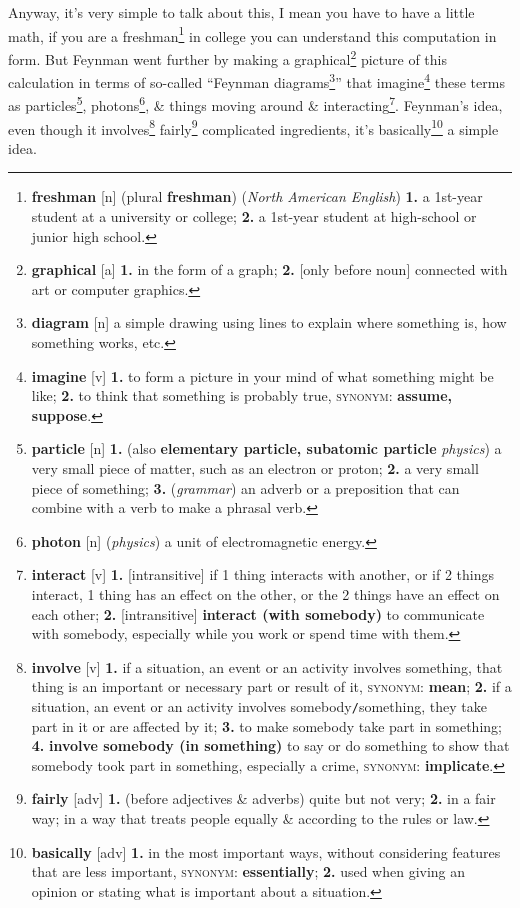 \documentclass[oneside]{book}
\numberwithin{equation}{section}
\begin{document}
Anyway, it's very simple to talk about this, I mean you have to have a little math, if you are a freshman\footnote{\textbf{freshman} [n] (plural \textbf{freshman}) (\textit{North American English}) \textbf{1.} a 1st-year student at a university or college; \textbf{2.} a 1st-year student at high-school or junior high school.} in college you can understand this computation in form. But Feynman went further by making a graphical\footnote{\textbf{graphical} [a] \textbf{1.} in the form of a graph; \textbf{2.} [only before noun] connected with art or computer graphics.} picture of this calculation in terms of so-called ``Feynman diagrams\footnote{\textbf{diagram} [n] a simple drawing using lines to explain where something is, how something works, etc.}'' that imagine\footnote{\textbf{imagine} [v] \textbf{1.} to form a picture in your mind of what something might be like; \textbf{2.} to think that something is probably true, \textsc{synonym}: \textbf{assume, suppose}.} these terms as particles\footnote{\textbf{particle} [n] \textbf{1.} (also \textbf{elementary particle, subatomic particle} \textit{physics}) a very small piece of matter, such as an electron or proton; \textbf{2.} a very small piece of something; \textbf{3.} (\textit{grammar}) an adverb or a preposition that can combine with a verb to make a phrasal verb.}, photons\footnote{\textbf{photon} [n] (\textit{physics}) a unit of electromagnetic energy.}, \& things moving around \& interacting\footnote{\textbf{interact} [v] \textbf{1.} [intransitive] if 1 thing interacts with another, or if 2 things interact, 1 thing has an effect on the other, or the 2 things have an effect on each other; \textbf{2.} [intransitive] \textbf{interact (with somebody)} to communicate with somebody, especially while you work or spend time with them.}. Feynman's idea, even though it involves\footnote{\textbf{involve} [v] \textbf{1.} if a situation, an event or an activity involves something, that thing is an important or necessary part or result of it, \textsc{synonym}: \textbf{mean}; \textbf{2.} if a situation, an event or an activity involves somebody\texttt{/}something, they take part in it or are affected by it; \textbf{3.} to make somebody take part in something; \textbf{4.} \textbf{involve somebody (in something)} to say or do something to show that somebody took part in something, especially a crime, \textsc{synonym}: \textbf{implicate}.} fairly\footnote{\textbf{fairly} [adv] \textbf{1.} (before adjectives \& adverbs) quite but not very; \textbf{2.} in a fair way; in a way that treats people equally \& according to the rules or law.} complicated ingredients, it's basically\footnote{\textbf{basically} [adv] \textbf{1.} in the most important ways, without considering features that are less important, \textsc{synonym}: \textbf{essentially}; \textbf{2.} used when giving an opinion or stating what is important about a situation.} a simple idea.
\end{document}
